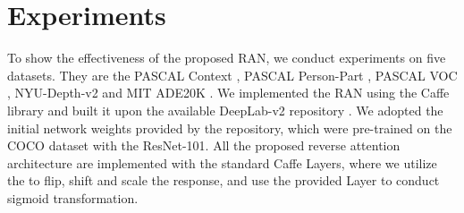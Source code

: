 \documentclass[runningheads]{llncs}
\begin{document}
\section{Experiments}
\begin{table*}[t]
\begin{center}
\end{center}
\caption{Comparison of semantic image segmentation performance scores () 
on the 5,105 test images of the PASCAL Context dataset.}\label{tab:context}
\end{table*}



To show the effectiveness of the proposed RAN, we conduct experiments on
five datasets. They are the PASCAL Context \cite{mottaghi2014role},
PASCAL Person-Part \cite{chen2014detect}, PASCAL VOC
\cite{Everingham10}, NYU-Depth-v2 \cite{Silberman:ECCV12} and MIT ADE20K
\cite{zhou2016semantic}.  We implemented the RAN using the Caffe
\cite{jia2014caffe} library and built it upon the available DeepLab-v2
repository \cite{chen2016deeplab}. We adopted the initial network
weights provided by the repository, which were pre-trained on 
the COCO dataset with the ResNet-101. All the proposed reverse attention architecture are implemented with the standard Caffe Layers,
where we utilize the  to flip, shift and scale the response, and use the provided 
Layer to conduct sigmoid transformation.
 
\end{document}
